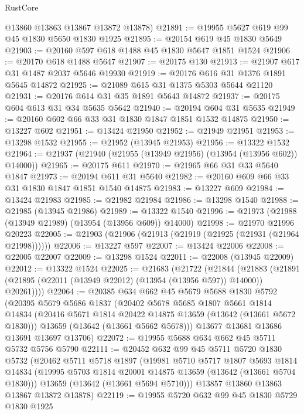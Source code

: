 \begin{lexlean}{RustCore}
\begin{coremodule}
      @13860
      @13863
      @13867
      @13872
      @13878)
@21891 := @19955 @5627 @619 @99 @45 @1830 @5650 @1830 @1925
@21895 := @20154 @619 @45 @1830 @5649
@21903 := @20160 @597 @618 @1488 @45 @1830 @5647 @1851 @1524
@21906 := @20170 @618 @1488 @5647
@21907 := @20175 @130
@21913 := @21907 @617 @31 @1487 @2037 @5646 @19930
@21919 := @20176 @616 @31 @1376 @1891 @5645 @14872
@21925 := @21089 @615 @31 @1375 @5303 @5644 @21120
@21931 := @20176 @614 @31 @35 @1891 @5643 @14872
@21937 := @20175 @604 @613 @31 @34 @5635 @5642
@21940 := @20194 @604 @31 @5635
@21949 := @20160 @602 @66 @33 @31 @1830 @1847 @1851 @1532 @14875
@21950 := @13227 @602
@21951 := @13424 @21950
@21952 := @21949 @21951
@21953 := @13298 @1532
@21955 := @21952 (@13945 @21953)
@21956 := @13322 @1532
@21964 := @21937 (@21940 (@21955 (@13949 @21956) (@13954 (@13956 @602)) @14000))
@21965 := @20175 @611
@21970 := @21965 @66 @31 @33 @5640 @1847
@21973 := @20194 @611 @31 @5640
@21982 := @20160 @609 @66 @33 @31 @1830 @1847 @1851 @1540 @14875
@21983 := @13227 @609
@21984 := @13424 @21983
@21985 := @21982 @21984
@21986 := @13298 @1540
@21988 := @21985 (@13945 @21986)
@21989 := @13322 @1540
@21996 := @21973 (@21988 (@13949 @21989) (@13954 (@13956 @609)) @14000)
@21998 := @21970 @21996 @20223
@22005 := @21903 (@21906 (@21913 (@21919 (@21925 (@21931 (@21964 @21998))))))
@22006 := @13227 @597
@22007 := @13424 @22006
@22008 := @22005 @22007
@22009 := @13298 @1524
@22011 := @22008 (@13945 @22009)
@22012 := @13322 @1524
@22025 := @21683
    (@21722
      (@21844
        (@21883 (@21891 (@21895 (@22011 (@13949 @22012) (@13954 (@13956 @597)) @14000)) @20261))))
@22064 := @20385
    @634
    @662
    @45
    @5679
    @5688
    @1830
    @5792
    (@20395
      @5679
      @5686
      @1837
      (@20402
        @5678
        @5685
        @1807
        @5661
        @1814
        @14834
        (@20416 @5671 @1814 @20422 @14875 @13659 (@13642 (@13661 @5672 @1830)))
        @13659
        (@13642 (@13661 @5662 @5678)))
      @13677
      @13681
      @13686
      @13691
      @13697
      @13706)
@22072 := @19955 @5688 @634 @662 @45 @5711 @5732 @5756 @5790
@22111 := @20452
    @632
    @99
    @45
    @5711
    @5720
    @1830
    @5732
    (@20462
      @5711
      @5718
      @1897
      (@19981
        @5710
        @5717
        @1807
        @5693
        @1814
        @14834
        (@19995 @5703 @1814 @20001 @14875 @13659 (@13642 (@13661 @5704 @1830)))
        @13659
        (@13642 (@13661 @5694 @5710)))
      @13857
      @13860
      @13863
      @13867
      @13872
      @13878)
@22119 := @19955 @5720 @632 @99 @45 @1830 @5729 @1830 @1925

\end{coremodule}
\end{lexlean}
